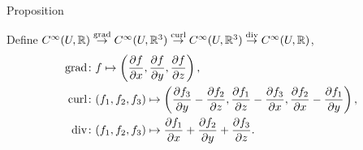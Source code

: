 \documentclass[xcolor=dvipsnames]{beamer}
\begin{document}
\begin{frame}
\begin{block}{Proposition}
    \end{block}
        \begin{definition}
            Define $C^{\infty}(U,\mathbb{R}) \overset{\operatorname{grad}}{\to } C^{\infty}(U,\mathbb{R}^3)\overset{\operatorname{curl}}{\to } C^{\infty}(U,\mathbb{R}^3)\overset{\operatorname{div}}{\to } C^{\infty}(U,\mathbb{R})$, 
        \begin{align*}
   \operatorname{grad} \colon &f \mapsto \left( \frac{\partial f}{\partial x},\frac{\partial f}{\partial y},\frac{\partial f}{\partial z} \right), \\
   \operatorname{curl} \colon   &(f_1,f_2,f_3) \mapsto \left( \frac{\partial f_3}{\partial y}-\frac{\partial f_2}{\partial z},\frac{\partial f_1}{\partial z}-\frac{\partial f_3}{\partial x},\frac{\partial f_2}{\partial x}-\frac{\partial f_1}{\partial y}\right), \\
\operatorname{div} \colon &(f_1,f_2,f_3) \mapsto \frac{\partial f_1}{\partial x}+\frac{\partial f_2}{\partial y}+\frac{\partial f_3}{\partial z}.
\end{align*}
        \end{definition}%
    \end{frame}
\end{document}
